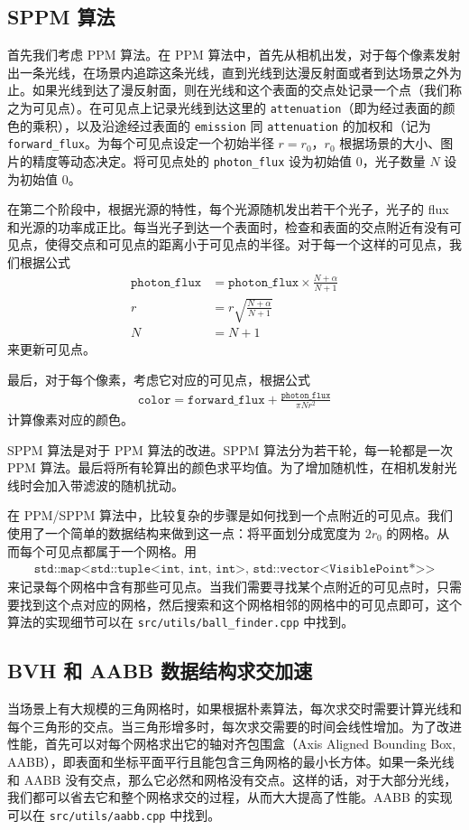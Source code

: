 \documentclass[cn]{report}
\let\t\texttt
\begin{document}
    \subsection{SPPM 算法}

    首先我们考虑 PPM 算法。在 PPM 算法中，首先从相机出发，对于每个像素发射出一条光线，在场景内追踪这条光线，直到光线到达漫反射面或者到达场景之外为止。如果光线到达了漫反射面，则在光线和这个表面的交点处记录一个点（我们称之为可见点）。在可见点上记录光线到达这里的 \t{attenuation}（即为经过表面的颜色的乘积），以及沿途经过表面的 \t{emission} 同 \t{attenuation} 的加权和（记为 \t{forward\_flux}。为每个可见点设定一个初始半径 $r = r_0$，$r_0$ 根据场景的大小、图片的精度等动态决定。将可见点处的 \t{photon\_flux} 设为初始值 0，光子数量 $N$ 设为初始值 0。

    在第二个阶段中，根据光源的特性，每个光源随机发出若干个光子，光子的 flux 和光源的功率成正比。每当光子到达一个表面时，检查和表面的交点附近有没有可见点，使得交点和可见点的距离小于可见点的半径。对于每一个这样的可见点，我们根据公式
    \begin{align}
        \t{photon\_flux} &= \t{photon\_flux} \times \frac{N + \alpha}{N + 1} \\
        r &= r \sqrt{\frac{N + \alpha}{N + 1}} \\
        N &= N + 1
    \end{align}
    来更新可见点。

    最后，对于每个像素，考虑它对应的可见点，根据公式 \begin{align}
        \t{color} = \t{forward\_flux} + \frac{\t{photon\_flux}}{\pi N r^2}
    \end{align} 计算像素对应的颜色。

    SPPM 算法是对于 PPM 算法的改进。SPPM 算法分为若干轮，每一轮都是一次 PPM 算法。最后将所有轮算出的颜色求平均值。为了增加随机性，在相机发射光线时会加入带滤波的随机扰动。

    在 PPM/SPPM 算法中，比较复杂的步骤是如何找到一个点附近的可见点。我们使用了一个简单的数据结构来做到这一点：将平面划分成宽度为 $2r_0$ 的网格。从而每个可见点都属于一个网格。用 \begin{align}\t{std::map<std::tuple<int, int, int>, std::vector<VisiblePoint*>>}\end{align} 来记录每个网格中含有那些可见点。当我们需要寻找某个点附近的可见点时，只需要找到这个点对应的网格，然后搜索和这个网格相邻的网格中的可见点即可，这个算法的实现细节可以在 \t{src/utils/ball\_finder.cpp} 中找到。

    \subsection{BVH 和 AABB 数据结构求交加速}
    当场景上有大规模的三角网格时，如果根据朴素算法，每次求交时需要计算光线和每个三角形的交点。当三角形增多时，每次求交需要的时间会线性增加。为了改进性能，首先可以对每个网格求出它的轴对齐包围盒（Axis Aligned Bounding Box, AABB），即表面和坐标平面平行且能包含三角网格的最小长方体。如果一条光线和 AABB 没有交点，那么它必然和网格没有交点。这样的话，对于大部分光线，我们都可以省去它和整个网格求交的过程，从而大大提高了性能。AABB 的实现可以在 \t{src/utils/aabb.cpp} 中找到。
\end{document}
